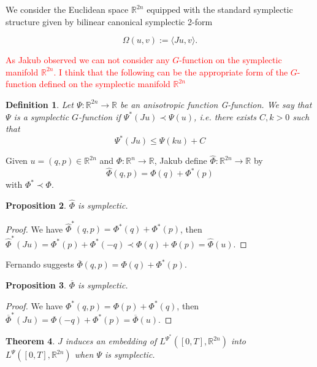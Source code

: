 \documentclass[twoside]{article}
\newtheorem{thm}{Theorem}[section]
\newtheorem{defi}[thm]{Definition}
\newtheorem{prop}[thm]{Proposition}
\theoremstyle{remark}
\newcommand{\rr}{\mathbb{R}}
\renewcommand{\leq}{\leqslant}
\newcommand{\Phie}{\Phi^{\star}}
\begin{document}
We  consider the  Euclidean space $\rr^{2n}$ equipped with the standard  symplectic structure given by bilinear canonical symplectic 2-form

\[\Omega(u,v):=\langle Ju,v\rangle .\]

\textcolor{red}{As Jakub observed we can not consider any $G$-function on the symplectic manifold $\rr^{2n}$. I think that the following can be the appropriate form of the $G$-function defined on the symplectic manifold $\rr^{2n}$}

\begin{defi}
Let $\Psi:\rr^{2n}\to \rr$ be an anisotropic function G-function.
We say that $\Psi$ is a \emph{symplectic $G$-function} if $\Psi^*(Ju)\prec \Psi(u)$, i.e.
there exists $C,k>0$ such that
\[
\Psi^*(Ju)\leq \Psi(ku)+C
\]
\end{defi}

Given $u=(q,p)\in \rr^{2n}$ and $\Phi:\rr^n \to \rr$, 
\textcolor[rgb]{1,0,0}{Jakub} define $\hat{\Phi}:\rr^{2n}\to \rr$ by
\[
\hat{\Phi}(q,p)=\Phi(q)+\Phi^*(p)
\]
with $\Phi^* \prec \Phi$.

\begin{prop}
$\hat{\Phi}$ is symplectic.
\end{prop}

\begin{proof}
We have ${\hat\Phi}^*(q,p)=\Phi^*(q)+\Phi^*(p)$, then 
${\hat \Phi}^*(Ju)=\Phi^*(p)+\Phi^*(-q)\prec \Phi(q)+\Phi(p)=\hat{\Phi}(u)$.
\end{proof}

\textcolor[rgb]{1,0,0}{Fernando} suggests  $\overline{\Phi}(q,p)=\Phi(q)+\Phi^*(p)$.

\begin{prop}
$\overline \Phi$ is symplectic.
\end{prop}

\begin{proof}
We have $\Phi^*(q,p)=\Phi(p)+\Phi^*(q)$, then 
$\overline{\Phi}^*(Ju)=\Phi(-q)+\Phi^*(p)=\overline{\Phi}(u)$.
\end{proof}




\begin{thm}
$J$ induces an embedding of $L^{\Psi^*}([0,T],\rr^{2n})$
into $L^{\Psi}([0,T],\rr^{2n})$ when $\Psi$ is symplectic.
\end{thm}
\end{document}
